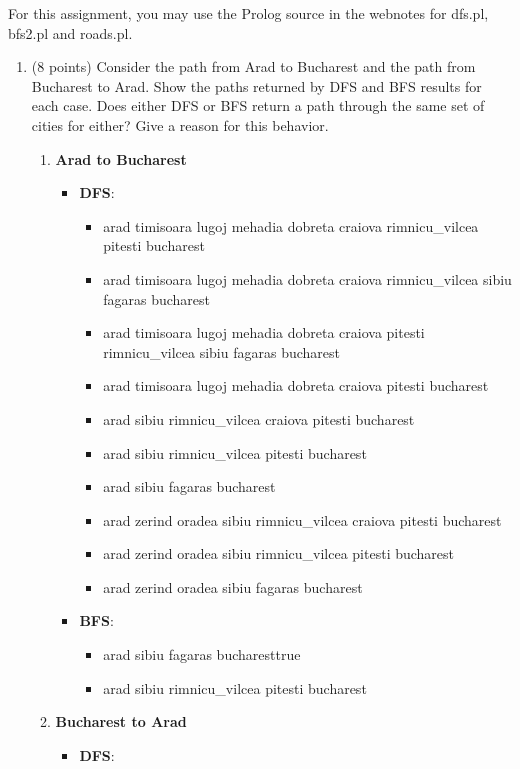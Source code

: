 \documentclass{article}%
\begin{document}
\begin{enumerate}
For this assignment, you may use the Prolog source in the webnotes for dfs.pl, bfs2.pl and roads.pl. 

	\begin{enumerate}
	\item (8 points) Consider the path from Arad to Bucharest and the path from Bucharest to Arad. Show the paths returned by DFS and BFS results for each case.
Does either DFS or BFS return a path through the same set of cities for either? Give a reason for this behavior.
		\begin{enumerate}
		\item \textbf{Arad to Bucharest}
			\begin{itemize}
			\item \textbf{DFS}:
				\begin{itemize}
				\item arad timisoara lugoj mehadia dobreta craiova rimnicu\_vilcea pitesti bucharest
				\item arad timisoara lugoj mehadia dobreta craiova rimnicu\_vilcea sibiu fagaras bucharest 
				\item arad timisoara lugoj mehadia dobreta craiova pitesti rimnicu\_vilcea sibiu fagaras bucharest 
				\item arad timisoara lugoj mehadia dobreta craiova pitesti bucharest 
				\item arad sibiu rimnicu\_vilcea craiova pitesti bucharest 
				\item arad sibiu rimnicu\_vilcea pitesti bucharest 
				\item arad sibiu fagaras bucharest 
				\item arad zerind oradea sibiu rimnicu\_vilcea craiova pitesti bucharest 
				\item arad zerind oradea sibiu rimnicu\_vilcea pitesti bucharest 
				\item arad zerind oradea sibiu fagaras bucharest 
				\end{itemize}
			\item \textbf{BFS}:
				\begin{itemize}
				\item arad sibiu fagaras bucharesttrue 
				\item arad sibiu rimnicu\_vilcea pitesti bucharest
				\end{itemize}
			\end{itemize}
		\item \textbf{Bucharest to Arad}
		\begin{itemize}
			\item \textbf{DFS}:

\end{itemize}
\end{enumerate}
\end{enumerate}
\end{enumerate}
\end{document}
